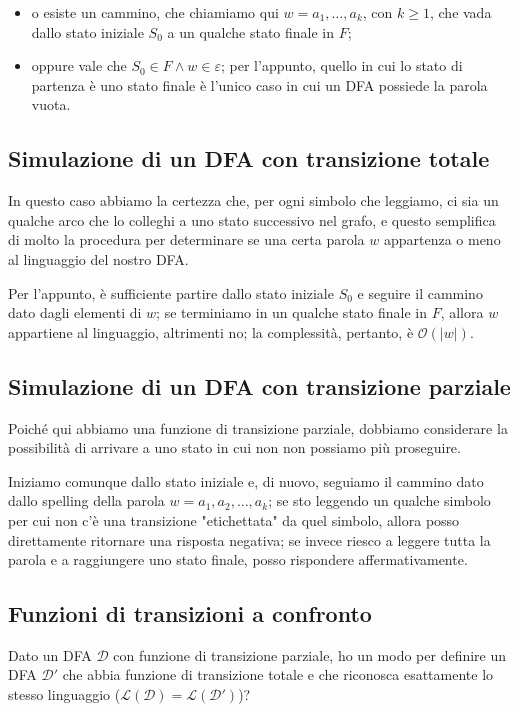 \documentclass[class=book, crop=false, oneside, 12pt]{standalone}
\begin{document}
\begin{itemize}
    \item o esiste un cammino, che chiamiamo qui \(w = a_1, \ldots, a_k\), con \(k \ge 1\), che vada dallo stato iniziale \(S_0\) a un qualche stato finale in \(F\);
    \item oppure vale che \(S_0 \in F \land w \in \varepsilon\); per l'appunto, quello in cui lo stato di partenza è uno stato finale è l'unico caso in cui un DFA possiede la parola vuota.
\end{itemize}

\subsection{Simulazione di un DFA con transizione totale}
In questo caso abbiamo la certezza che, per ogni  simbolo che leggiamo, ci sia un qualche arco che lo colleghi a uno stato successivo nel grafo, e questo semplifica di molto la procedura per determinare se una certa parola \(w\) appartenza o meno al linguaggio del nostro DFA.

Per l'appunto, è sufficiente partire dallo stato iniziale \(S_0\) e seguire il cammino dato dagli elementi di \(w\); se terminiamo in un qualche stato finale in \(F\), allora \(w\) appartiene al linguaggio, altrimenti no; la complessità, pertanto, è \(\mathcal{O}(|w|)\).

\subsection{Simulazione di un DFA con transizione parziale}
Poiché qui abbiamo una funzione di transizione parziale, dobbiamo considerare la possibilità di arrivare a uno stato in cui non non possiamo più proseguire. 

Iniziamo comunque dallo stato iniziale e, di nuovo, seguiamo il cammino dato dallo spelling della parola \(w = a_1, a_2, \ldots, a_k\); se sto leggendo un qualche simbolo per cui non c'è una transizione "etichettata" da quel simbolo, allora posso direttamente ritornare una risposta negativa; se invece riesco a leggere tutta la parola e a raggiungere uno stato finale, posso rispondere affermativamente.

\subsection{Funzioni di transizioni a confronto}
Dato un DFA \(\mathcal{D}\) con funzione di transizione parziale, ho un modo per definire un DFA \(\mathcal{D}'\) che abbia funzione di transizione totale e che riconosca esattamente lo stesso linguaggio (\(\mathcal{L(D) = \mathcal{L}(\mathcal{D}')}\))?
\end{document}
